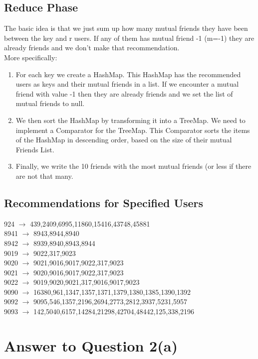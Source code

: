 \documentclass[11pt]{article}
\begin{document}
\subsection*{Reduce Phase} 
The basic idea is that we just sum up how many mutual friends they have been between the key and r users. If any of them has mutual friend -1 (m=-1) they are already friends and we don't make that recommendation. \\
More specifically:\\
\begin{enumerate}
\item For each key we create a HashMap. This HashMap has the recommended users as keys and their mutual friends in a list. If we encounter a mutual friend with value -1 then they are already friends and we set the list of mutual friends to null.
\item We then sort the HashMap by transforming it into a TreeMap. We need to implement a Comparator for the TreeMap. This Comparator sorts the items of the HashMap in descending order, based on the size of their mutual Friends List.
\item Finally, we write the 10 friends with the most mutual friends (or less if there are not that many.
\end{enumerate}

\subsection*{Recommendations for Specified Users}
924	$\rightarrow$	439,2409,6995,11860,15416,43748,45881 \\
8941 $\rightarrow$	8943,8944,8940 \\
8942 $\rightarrow$	8939,8940,8943,8944\\
9019 $\rightarrow$   9022,317,9023\\
9020 $\rightarrow$	9021,9016,9017,9022,317,9023\\
9021 $\rightarrow$	9020,9016,9017,9022,317,9023\\
9022 $\rightarrow$	9019,9020,9021,317,9016,9017,9023\\
9090 $\rightarrow$	16380,961,1347,1357,1371,1379,1380,1385,1390,1392\\
9092 $\rightarrow$	9095,546,1357,2196,2694,2773,2812,3937,5231,5957\\
9093 $\rightarrow$	142,5040,6157,14284,21298,42704,48442,125,338,2196\\

\pagebreak[4]
\section*{Answer to Question 2(a)}
\end{document}

